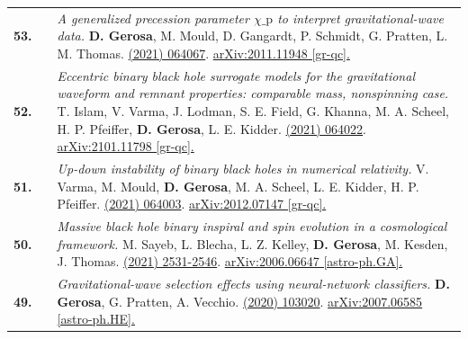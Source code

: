 {\begin{longtable}{rp{0.3cm}p{15.8cm}}
%
\textbf{53.} & & \textit{A generalized precession parameter $\chi\_\mathrm{p}$ to interpret gravitational-wave data.}
\newline{}
\textbf{D. Gerosa}, M. Mould, D. Gangardt, P. Schmidt, G. Pratten, L. M. Thomas.
\newline{}
\href{https://journals.aps.org/prd/abstract/10.1103/PhysRevD.103.064067}{\prd 103 (2021) 064067}. \href{https://arxiv.org/abs/2011.11948}{arXiv:2011.11948 [gr-qc].}
\vspace{0.09cm}\\
%
\textbf{52.} & & \textit{Eccentric binary black hole surrogate models for the gravitational waveform and remnant properties: comparable mass, nonspinning case.}
\newline{}
T. Islam, V. Varma, J. Lodman, S. E. Field, G. Khanna, M. A. Scheel, H. P. Pfeiffer,  \textbf{D. Gerosa}, L. E. Kidder.
\newline{}
\href{https://journals.aps.org/prd/abstract/10.1103/PhysRevD.103.064022}{\prd 103 (2021) 064022}. \href{https://arxiv.org/abs/2101.11798}{arXiv:2101.11798 [gr-qc].}
\vspace{0.09cm}\\
%
\textbf{51.} & & \textit{Up-down instability of binary black holes in numerical relativity.}
\newline{}
V. Varma, M. Mould, \textbf{D. Gerosa}, M. A. Scheel, L. E. Kidder, H. P. Pfeiffer.
\newline{}
\href{https://journals.aps.org/prd/abstract/10.1103/PhysRevD.103.064003}{\prd 103 (2021) 064003}. \href{https://arxiv.org/abs/2012.07147}{arXiv:2012.07147 [gr-qc].}
\vspace{0.09cm}\\
%
\textbf{50.} & & \textit{Massive black hole binary inspiral and spin evolution in a cosmological framework.}
\newline{}
M. Sayeb, L. Blecha, L. Z. Kelley, \textbf{D. Gerosa}, M. Kesden, J. Thomas.
\newline{}
\href{https://doi.org/10.1093/mnras/staa3826}{\mnras 501 (2021) 2531-2546}. \href{https://arxiv.org/abs/2006.06647}{arXiv:2006.06647 [astro-ph.GA].}
\vspace{0.09cm}\\
%
\textbf{49.} & & \textit{Gravitational-wave selection effects using neural-network classifiers.}
\newline{}
\textbf{D. Gerosa}, G. Pratten, A. Vecchio.
\newline{}
\href{https://journals.aps.org/prd/abstract/10.1103/PhysRevD.102.103020}{\prd 102 (2020) 103020}. \href{https://arxiv.org/abs/2007.06585}{arXiv:2007.06585 [astro-ph.HE].}

\end{longtable}}
